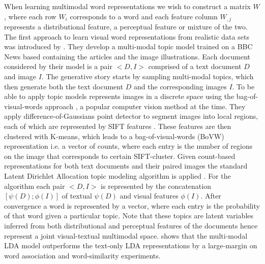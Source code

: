 When learning multimodal word representations we wish to construct a matrix $W$, where each row $W_i$
corresponds to a word and each feature column $W_{,j}$ represents a distributional feature,
a perceptual feature or mixture of the two.
The first approach to learn visual word representations from realistic data sets
was introduced by \cite{feng2010visual}. They develop a multi-modal topic model trained on a
BBC News based containing the articles and the image illustrations. Each document considered by their model
is a pair $<D, I>$ comprised of a text document $D$ and image $I$.
The generative story starts by sampling multi-modal topics,
which then generate both the text document $D$ and the corresponding images $I$.
To be able to apply topic models \cite{feng2010visual} represents images
in a discrete space using the bag-of-visual-words approach \citep{csurka2004visual},
a popular computer vision method at the time.
They apply difference-of-Gaussians point detector to segment images
into local regions, each of which are represented by SIFT features \citep{lowe1999object}.
These features are then clustered with K-means, which leads to a
bag-of-visual-words (BoVW) representation i.e.
a vector of counts, where each entry is the number of regions on the image that
corresponds to certain SIFT-cluster. Given count-based representations for both
text documents and their paired images the standard
Latent Dirichlet Allocation topic modeling algorithm is applied \citep{blei2003latent}.
For the algorithm each pair $<D, I>$ is represented by the concatenation
$[\psi(D);\phi(I)]$ of textual $\psi(D)$ and visual features $\phi(I)$.
After convergence a word is represented by a vector,
where each entry is the probability of that word given a particular topic.
Note that these topics are latent variables inferred from
both distributional and perceptual features of the documents hence represent a joint
visual-textual multimodal space. \cite{feng2010visual}
shows that the multi-modal LDA model outperforms the text-only LDA representations by a
large-margin on word association and word-similarity experiments.

